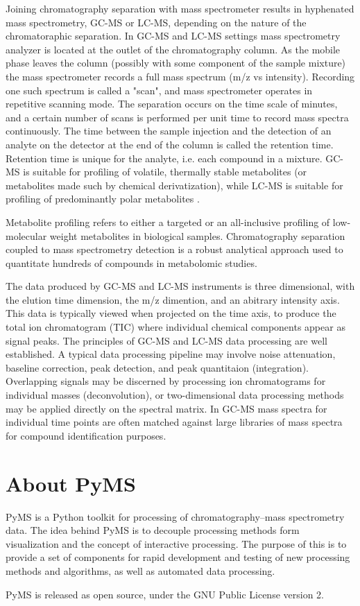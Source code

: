 Joining chromatography separation with mass spectrometer results in
hyphenated mass spectrometry, GC-MS or LC-MS, depending on the nature
of the chromatoraphic separation. In GC-MS and LC-MS settings mass
spectrometry analyzer is located at the outlet of the chromatography
column. As the mobile phase leaves the column (possibly with some
component of the sample mixture) the mass spectrometer records a full
mass spectrum (m/z vs intensity). Recording one such spectrum is called
a "scan", and mass spectrometer operates in repetitive scanning mode.
The separation occurs on the time scale of minutes, and a certain
number of scans is performed per unit time to record mass spectra
continuously. The time between the sample injection and the detection
of an analyte on the detector at the end of the column is called the
retention time.  Retention time is unique for the analyte, i.e. each
compound in a mixture.  GC-MS is suitable for profiling of volatile,
thermally stable metabolites (or metabolites made such by chemical
derivatization), while LC-MS is suitable for profiling of predominantly
polar metabolites \cite{halket05}.

Metabolite profiling refers to either a targeted or an all-inclusive
profiling of low-molecular weight metabolites in biological samples.
Chromatography separation coupled to mass spectrometry detection is
a robust analytical approach used to quantitate hundreds of compounds
in metabolomic studies.

The data produced by GC-MS and LC-MS instruments is three dimensional,
with the elution time dimension, the m/z dimention, and an abitrary
intensity axis. This data is typically viewed when projected on the
time axis, to produce the total ion chromatogram (TIC) where individual
chemical components appear as signal peaks. The principles of GC-MS
and LC-MS data processing are well established. A typical data processing
pipeline may involve noise attenuation, baseline correction, peak
detection, and peak quantitaion (integration).  Overlapping signals
may be discerned by processing ion chromatograms for individual masses
(deconvolution), or two-dimensional data processing methods may be
applied directly on the spectral matrix. In GC-MS mass spectra for
individual time points are often matched against large libraries of
mass spectra for compound identification purposes.

\section{About PyMS}

PyMS is a Python toolkit for processing of chromatography--mass
spectrometry data. The idea behind PyMS is to decouple processing
methods form visualization and the concept of interactive processing.
The purpose of this is to provide a set of components for rapid
development and testing of new processing methods and algorithms,
as well as automated data processing.

PyMS is released as open source, under the GNU Public License
version 2.  

